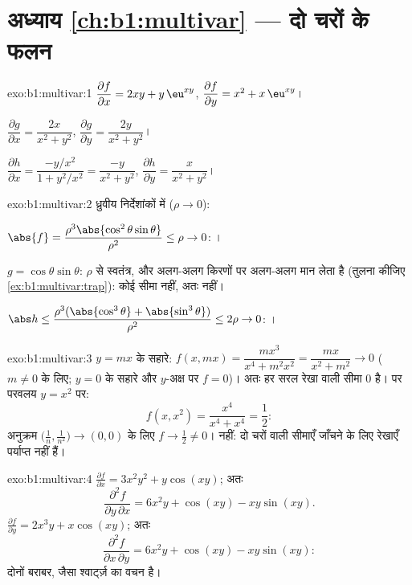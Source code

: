 \section*{अध्याय \ref{ch:b1:multivar} --- दो चरों के फलन}

\begin{solution}{exo:b1:multivar:1}
$\dfrac{\partial f}{\partial x} = 2xy + y\,\eu^{xy}$,
$\dfrac{\partial f}{\partial y} = x^2 + x\,\eu^{xy}$।

$\dfrac{\partial g}{\partial x} = \dfrac{2x}{x^2+y^2}$,
$\dfrac{\partial g}{\partial y} = \dfrac{2y}{x^2+y^2}$।

$\dfrac{\partial h}{\partial x} = \dfrac{-y/x^2}{1 + y^2/x^2} =
\dfrac{-y}{x^2+y^2}$,
$\dfrac{\partial h}{\partial y} = \dfrac{x}{x^2+y^2}$।
\end{solution}

\begin{solution}{exo:b1:multivar:2}
ध्रुवीय निर्देशांकों में ($\rho \to 0$):

$\abs{f} = \dfrac{\rho^3\abs{\cos^2\theta\sin\theta}}{\rho^2} \leq
\rho \to 0$: ।

$g = \cos\theta\sin\theta$: $\rho$ से स्वतंत्र, और अलग-अलग किरणों पर
अलग-अलग मान लेता है (तुलना कीजिए \cref{ex:b1:multivar:trap}): कोई सीमा
नहीं, अतः  नहीं।

$\abs h \leq \dfrac{\rho^3(\abs{\cos^3\theta} +
\abs{\sin^3\theta})}{\rho^2} \leq 2\rho \to 0$: ।
\end{solution}

\begin{solution}{exo:b1:multivar:3}
$y = mx$ के सहारे: $f(x, mx) = \dfrac{m x^3}{x^4 + m^2 x^2} =
\dfrac{mx}{x^2 + m^2} \to 0$ ($m \neq 0$ के लिए; $y = 0$ के सहारे और
$y$-अक्ष पर $f = 0$)। अतः हर सरल रेखा वाली सीमा $0$ है। पर परवलय $y = x^2$
पर:
\[
f(x, x^2) = \frac{x^4}{x^4 + x^4} = \frac12 :
\]
अनुक्रम $\bigl(\frac1n, \frac{1}{n^2}\bigr) \to (0,0)$ के लिए $f \to
\frac12 \neq 0$।  नहीं: दो चरों वाली सीमाएँ जाँचने के लिए रेखाएँ
पर्याप्त नहीं हैं।
\end{solution}

\begin{solution}{exo:b1:multivar:4}
$\frac{\partial f}{\partial x} = 3x^2y^2 + y\cos(xy)$; अतः
\[
\frac{\partial^2 f}{\partial y\,\partial x}
= 6x^2 y + \cos(xy) - xy\sin(xy) .
\]
$\frac{\partial f}{\partial y} = 2x^3 y + x\cos(xy)$; अतः
\[
\frac{\partial^2 f}{\partial x\,\partial y}
= 6x^2 y + \cos(xy) - xy\sin(xy) :
\]
दोनों बराबर, जैसा श्वार्ट्ज़ का वचन है।
\end{solution}

